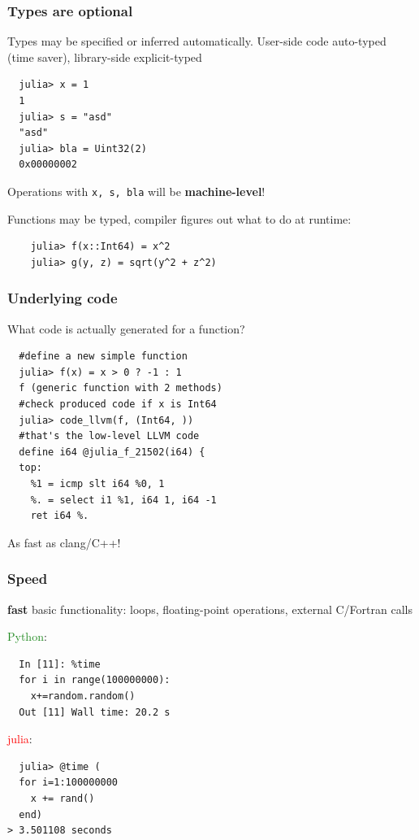 \documentclass[16pt]{beamer}
\begin{document}
\begin{frame}[fragile]
  \frametitle{Types are optional}

  \begin{centering}

  Types may be specified or inferred automatically.
  User-side code auto-typed (time saver), library-side explicit-typed
  \begin{lstlisting}
  julia> x = 1
  1
  julia> s = "asd"
  "asd"
  julia> bla = Uint32(2)
  0x00000002
  \end{lstlisting}
  Operations with \texttt{x, s, bla} will be \textbf{machine-level}!

  Functions may be typed, compiler figures out what to do at runtime:
  \begin{lstlisting}
    julia> f(x::Int64) = x^2
    julia> g(y, z) = sqrt(y^2 + z^2)
  \end{lstlisting}

  \end{centering}
\end{frame}

\begin{frame}[fragile]
  \frametitle{Underlying code}
  What code is actually generated for a function?
  \begin{lstlisting}
  #define a new simple function
  julia> f(x) = x > 0 ? -1 : 1
  f (generic function with 2 methods)
  #check produced code if x is Int64
  julia> code_llvm(f, (Int64, ))
  #that's the low-level LLVM code
  define i64 @julia_f_21502(i64) {
  top:
    %1 = icmp slt i64 %0, 1
    %. = select i1 %1, i64 1, i64 -1
    ret i64 %.
  \end{lstlisting}
  As fast as clang/C++!
\end{frame}

\begin{frame}[fragile]
\frametitle{Speed}

\begin{center}
\textbf{fast} basic functionality: loops, floating-point operations, external C/Fortran calls
\end{center}

\textcolor{ForestGreen}{Python}:
\begin{lstlisting}
  In [11]: %time
  for i in range(100000000):
    x+=random.random()
  Out [11] Wall time: 20.2 s
\end{lstlisting}

\textcolor{red}{julia}:
\begin{lstlisting}
  julia> @time (
  for i=1:100000000
    x += rand()
  end)
> 3.501108 seconds
\end{lstlisting}

\end{frame}
\end{document}
